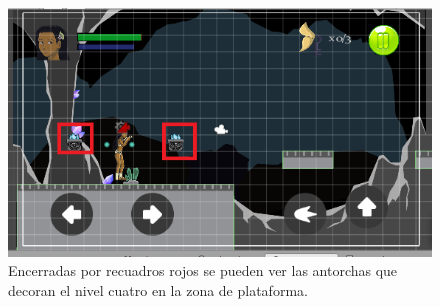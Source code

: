 \begin{figure}[h]
		\centering
		\includegraphics[height=0.2 \textheight]{03TrabajoRealizado/imagenes/objetosFondo.png}
		\caption{Encerradas por recuadros rojos se pueden ver las antorchas que decoran el nivel cuatro en la zona de plataforma.}
		\label{fig:ObjetoFon}
\end{figure}

